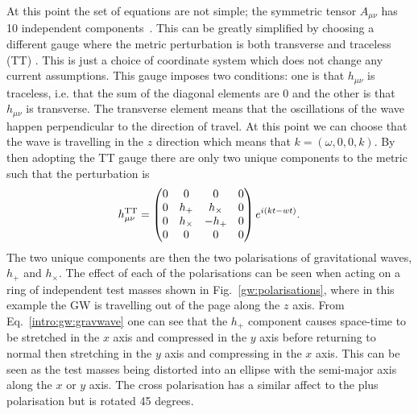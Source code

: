 At this point the set of equations are not simple; the symmetric tensor $A_{\mu \nu}$ has 10 independent
components~. This can be greatly
simplified by choosing a different gauge where the metric perturbation is both
transverse and traceless (TT) \citep{flanagan2005BasicsGravitational}.  This is
just a choice of coordinate system which does not change any current
assumptions. This gauge imposes two conditions: one
is that $h_{\mu \nu}$ is traceless, i.e. that the sum of the diagonal elements
are 0 and the other is that $h_{\mu \nu}$ is transverse.  The transverse
element means that the oscillations of the wave happen perpendicular to the
direction of travel.  At this point we can choose that the wave is travelling in
the $z$ direction which means that $k = (\omega,0,0,k)$.  By then adopting the
TT gauge there are only two unique components to the metric such that the
perturbation is
\begin{equation}
\label{intro:gw:gravwave}
h_{\mu \nu}^{\rm{TT}} = \left( 
\begin{matrix}
0 & 0 & 0 & 0 \\
0 & h_{+} & h_{\times} & 0 \\
0 & h_{\times} & -h_{+} & 0 \\
0 & 0 & 0 & 0 \\
\end{matrix}
\right) 
e^{i(kt - wt)}.
\end{equation}
The two unique components are then the two polarisations of gravitational
waves, $h_{+}$ and $h_{\times}$. The effect of each of the polarisations can be seen when acting on a ring of independent test masses shown in Fig.~\ref{gw:polarisations}, where in this example the \gls{GW} is travelling out of the page along the $z$ axis.
From Eq.~\ref{intro:gw:gravwave} one can see that the $h_{+}$ component causes space-time to be stretched in the $x$ axis and compressed in the $y$ axis before returning to normal then stretching in the $y$ axis and compressing in the $x$ axis. This can be seen as the test masses being distorted into an ellipse with the semi-major axis along the $x$ or $y$ axis.
The cross polarisation has a similar affect to the plus polarisation but is rotated 45 degrees.
%
